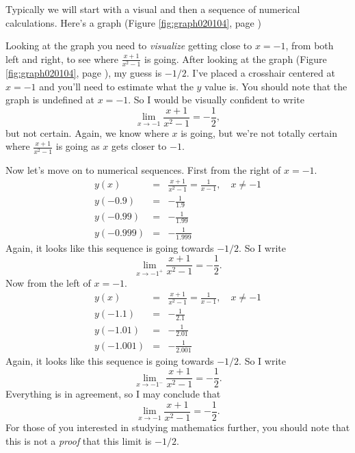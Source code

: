 \documentclass[12pt,addpoints, answers, fleqn]{exam}
\begin{document}
\begin{solution}
Typically we will start with a visual  and then a sequence of numerical calculations. Here's a graph (Figure \ref{fig:graph020104}, page \pageref{fig:graph020104})


Looking at the graph you need to \emph{visualize} getting close to $x=-1$, from both left and right, to see where $\displaystyle \frac{x+1}{x^2-1}$  is going. After looking at the graph (Figure \ref{fig:graph020104}, page \pageref{fig:graph020104}), my guess is $-1/2$. I've placed a crosshair centered at $x=-1$ and you'll need to estimate what the $y$ value is. You should note that the graph is undefined at $x=-1$. So I would be visually confident to write
\[
\mathop {\lim }\limits_{x \to -1 }  \frac{x+1}{x^2-1} = - \frac{1}{2},
\]
but not certain. Again, we know where $x$ is going, but we're not totally certain where $\displaystyle \frac{x+1}{x^2-1}$ is going as $x$ gets closer to $-1$.

Now let's move on to numerical sequences. First from the right of $x=-1$.
\begin{eqnarray*}
y\left( x \right) &=& \frac{x+1}{x^2-1} = \frac{1}{x-1}, \quad x \neq -1\\
y\left( -0.9 \right) &=& - \frac{1}{1.9}\\
y\left( -0.99 \right) &=& - \frac{1}{1.99}\\
y\left( -0.999 \right) &=&- \frac{1}{1.999}
\end{eqnarray*}
Again, it looks like this sequence is going towards $-1/2$. So I write
\[
\mathop {\lim }\limits_{x \to -1^+ }  \frac{x+1}{x^2-1} = - \frac{1}{2}.
\]
Now from the left of $x=-1$.
\begin{eqnarray*}
y\left( x \right) &=& \frac{x+1}{x^2-1} = \frac{1}{x-1}, \quad x \neq -1\\
y\left( -1.1 \right) &=& - \frac{1}{2.1}\\
y\left( -1.01 \right) &=& - \frac{1}{2.01}\\
y\left( -1.001 \right) &=&- \frac{1}{2.001}
\end{eqnarray*}
Again, it looks like this sequence is going towards $-1/2$. So I write
\[
\mathop {\lim }\limits_{x \to -1^- }  \frac{x+1}{x^2-1} = - \frac{1}{2}.
\]
Everything is in agreement, so I may conclude that
\[
\mathop {\lim }\limits_{x \to -1 }  \frac{x+1}{x^2-1} = - \frac{1}{2}.
\]
For those of you interested in studying mathematics further, you should note that this is not a \emph{proof} that this limit is $-1/2$.
\end{solution}
\end{document}
